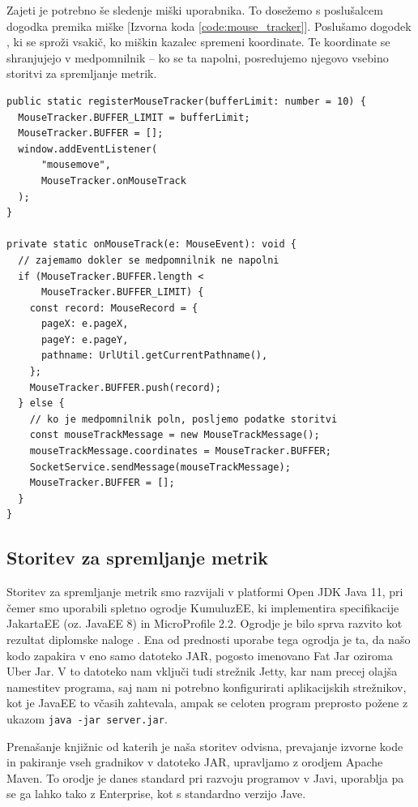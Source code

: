 \documentclass[a4paper, 12pt]{book}
\begin{document}
Zajeti je potrebno še sledenje miški uporabnika. To dosežemo s poslušalcem dogodka premika miške [Izvorna koda \ref{code:mouse_tracker}]. Poslušamo dogodek , ki se sproži vsakič, ko miškin kazalec spremeni koordinate. Te koordinate se shranjujejo v medpomnilnik -- ko se ta napolni, posredujemo njegovo vsebino storitvi za spremljanje metrik.

\begin{lstlisting}[label=code:mouse_tracker, caption=Spremljanje premikov miške]
public static registerMouseTracker(bufferLimit: number = 10) {
  MouseTracker.BUFFER_LIMIT = bufferLimit;
  MouseTracker.BUFFER = [];
  window.addEventListener(
      "mousemove",
      MouseTracker.onMouseTrack
  );
}

private static onMouseTrack(e: MouseEvent): void {
  // zajemamo dokler se medpomnilnik ne napolni
  if (MouseTracker.BUFFER.length < 
      MouseTracker.BUFFER_LIMIT) {
    const record: MouseRecord = {
      pageX: e.pageX,
      pageY: e.pageY,
      pathname: UrlUtil.getCurrentPathname(),
    };
    MouseTracker.BUFFER.push(record);
  } else {
    // ko je medpomnilnik poln, posljemo podatke storitvi
    const mouseTrackMessage = new MouseTrackMessage();
    mouseTrackMessage.coordinates = MouseTracker.BUFFER;
    SocketService.sendMessage(mouseTrackMessage);
    MouseTracker.BUFFER = [];
  }
}
\end{lstlisting} 

\subsection{Storitev za spremljanje metrik}
\label{ch3:sec2:sub2}

Storitev za spremljanje metrik smo razvijali v platformi Open JDK Java 11, pri čemer smo uporabili spletno ogrodje KumuluzEE, ki implementira specifikacije JakartaEE (oz. JavaEE 8) in MicroProfile 2.2. Ogrodje je bilo sprva razvito kot rezultat diplomske naloge \cite{kumuluz_diploma}. Ena od prednosti uporabe tega ogrodja je ta, da našo kodo zapakira v eno samo datoteko JAR, pogosto imenovano Fat Jar oziroma Uber Jar. V to datoteko nam vključi tudi strežnik Jetty, kar nam precej olajša namestitev programa, saj nam ni potrebno konfigurirati aplikacijskih strežnikov, kot je JavaEE to včasih zahtevala, ampak se celoten program preprosto požene z ukazom \verb|java -jar server.jar|.

Prenašanje knjižnic od katerih je naša storitev odvisna, prevajanje izvorne kode in pakiranje vseh gradnikov v datoteko JAR, upravljamo z orodjem Apache Maven. To orodje je danes standard pri razvoju programov v Javi, uporablja pa se ga lahko tako z Enterprise, kot s standardno verzijo Jave.
\end{document}
